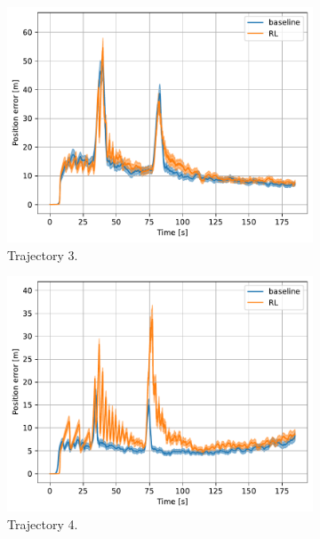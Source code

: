 \documentclass[english, 12pt, a4paper, elec, utf8, a-1b, online]{aaltothesis}
\begin{document}
\begin{figure}[htb]
    \hfill
    \begin{subfigure}[b]{0.45\textwidth}
        \centering
        \includegraphics[width=\linewidth]{figures/benchmark/Simulations/mean_position_error2.pdf}
        \caption{Trajectory 3.}
        \label{fig:TL_T3}
    \end{subfigure}
    \hfill
    \begin{subfigure}[b]{0.45\textwidth}
        \centering
        \includegraphics[width=\linewidth]{figures/benchmark/Simulations/mean_position_error3.pdf}
        \caption{Trajectory 4.}
        \label{fig:TL_T4}
    \end{subfigure}
    \hfill
    \begin{subfigure}[b]{0.45\textwidth}

\end{subfigure}
\end{figure}
\end{document}
